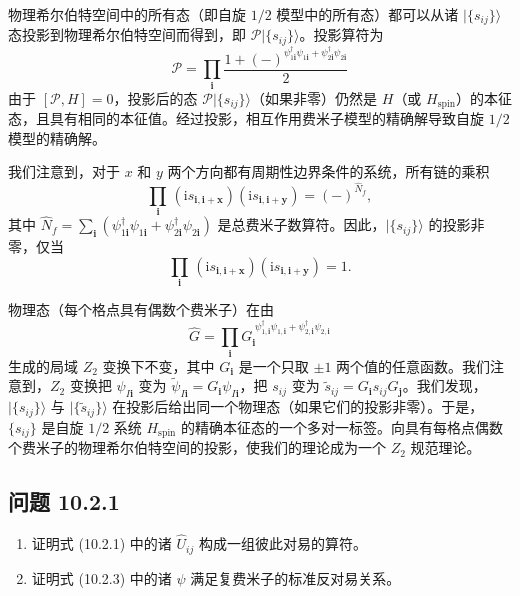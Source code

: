 物理希尔伯特空间中的所有态（即自旋 $1/2$ 模型中的所有态）都可以从诸 $|\{s_{ij}\}\rangle$ 态投影到物理希尔伯特空间而得到，即 $\mathcal{P}|\{s_{ij}\}\rangle$。投影算符为
\begin{equation*}
\mathcal{P}=\prod_{\pmb{i}}\frac{1+(-)^{\psi^{\dagger}_{1\pmb{i}}\psi_{1\pmb{i}}+\psi^{\dagger}_{2\pmb{i}}\psi_{2\pmb{i}}}}{2}
\end{equation*}
由于 $[\mathcal{P},H]=0$，投影后的态 $\mathcal{P}|\{s_{ij}\}\rangle$（如果非零）仍然是 $H$（或 $H_{\text{spin}}$）的本征态，且具有相同的本征值。经过投影，相互作用费米子模型的精确解导致自旋 $1/2$ 模型的精确解。

我们注意到，对于 $x$ 和 $y$ 两个方向都有周期性边界条件的系统，所有链的乘积
\begin{equation*}
\prod_{\pmb{i}}\,(\mathrm{i}s_{\pmb{i},\pmb{i}+\pmb{x}})(\mathrm{i}s_{\pmb{i},\pmb{i}+\pmb{y}})=(-)^{\hat N_f},
\tag{10.2.7}
\end{equation*}
其中 $\hat N_f=\sum_{\pmb{i}}(\psi^{\dagger}_{1\pmb{i}}\psi_{1\pmb{i}}+\psi^{\dagger}_{2\pmb{i}}\psi_{2\pmb{i}})$ 是总费米子数算符。因此，$|\{s_{ij}\}\rangle$ 的投影非零，仅当
\begin{equation*}
\prod_{\pmb{i}}\,(\mathrm{i}s_{\pmb{i},\pmb{i}+\pmb{x}})(\mathrm{i}s_{\pmb{i},\pmb{i}+\pmb{y}})=1.
\tag{10.2.8}
\end{equation*}

物理态（每个格点具有偶数个费米子）在由
\begin{equation*}
\hat G=\prod_{\pmb{i}}G_{\pmb{i}}^{\;\psi^{\dagger}_{1,\pmb{i}}\psi_{1,\pmb{i}}+\psi^{\dagger}_{2,\pmb{i}}\psi_{2,\pmb{i}}}
\end{equation*}
生成的局域 $Z_2$ 变换下不变，其中 $G_{\pmb{i}}$ 是一个只取 $\pm1$ 两个值的任意函数。我们注意到，$Z_2$ 变换把 $\psi_{I\pmb{i}}$ 变为 $\tilde\psi_{I\pmb{i}}=G_{\pmb{i}}\psi_{I\pmb{i}}$，把 $s_{ij}$ 变为 $\tilde s_{ij}=G_{\pmb{i}}s_{ij}G_{\pmb{j}}$。我们发现，$|\{s_{ij}\}\rangle$ 与 $|\{\tilde s_{ij}\}\rangle$ 在投影后给出同一个物理态（如果它们的投影非零）。于是，$\{s_{ij}\}$ 是自旋 $1/2$ 系统 $H_{\text{spin}}$ 的精确本征态的一个多对一标签。向具有每格点偶数个费米子的物理希尔伯特空间的投影，使我们的理论成为一个 $Z_2$ 规范理论。

\subsection*{问题 10.2.1}

\begin{enumerate}
\item[(a)] 证明式 (10.2.1) 中的诸 $\hat U_{ij}$ 构成一组彼此对易的算符。
\item[(b)] 证明式 (10.2.3) 中的诸 $\psi$ 满足复费米子的标准反对易关系。
\end{enumerate}

